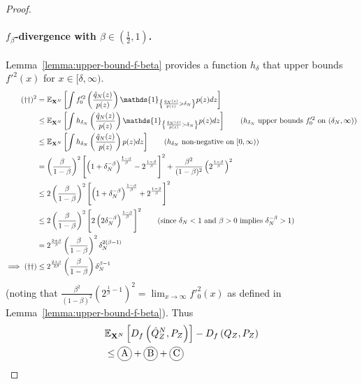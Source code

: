 \begin{proof}
\paragraph{$f_\beta$-divergence with $\beta\in(\frac{1}{2}, 1)$.}
Lemma~\ref{lemma:upper-bound-f-beta} provides a function $h_\delta$ that upper bounds $f'^2(x)$ for $x \in[\delta, \infty)$.
%
\begin{align*}
    (\dagger\dagger)^2 
    &= \E_{\XN} \left[ \int f_0'^2\left(\frac{\hat{q}_N(z)}{p(z)} \right) \mathds{1}_{\left\lbrace \frac{\hat{q}_N(z)}{p(z)} > \delta_N \right\rbrace} p(z) dz \right]
    \\
    &\leq \E_{\XN} \left[\int h_{\delta_N}\left(\frac{\hat{q}_N(z)}{p(z)} \right) \mathds{1}_{\left\lbrace \frac{\hat{q}_N(z)}{p(z)} > \delta_N \right\rbrace} p(z) dz \right]
    \qquad \text{($h_{\delta_N}$ upper bounds $f_0'^2$ on $(\delta_N, \infty)$)}
    \\
    &\leq \E_{\XN} \left[\int h_{\delta_N}\left(\frac{\hat{q}_N(z)}{p(z)} \right) p(z) dz \right]
    \qquad \text{($h_{\delta_N}$ non-negative on $[0, \infty)$)}
    \\
    &= \left(\frac{\beta}{1-\beta}\right)^2\left[ \left(1+\delta_N^{-\beta}\right)^\frac{1-\beta}{\beta}  - 2^{\frac{1-\beta}{\beta}}\right]^2 + \frac{\beta^2}{(1-\beta)^2}\left(2^{\frac{1-\beta}{\beta}}\right)^2\\
    &\leq 2\left(\frac{\beta}{1-\beta}\right)^2\left[ \left(1+\delta_N^{-\beta}\right)^\frac{1-\beta}{\beta}  + 2^{\frac{1-\beta}{\beta}}\right]^2\\
    &\leq 2\left(\frac{\beta}{1-\beta}\right)^2\left[ 2\left(2\delta_N^{-\beta}\right)^\frac{1-\beta}{\beta}\right]^2 
    \qquad (\text{since $\delta_N<1$ and $\beta>0$ implies $\delta_N^{-\beta} > 1$})\\
    &= 2^{\frac{2+\beta}{\beta}}\left(\frac{\beta}{1-\beta}\right)^2 \delta_N^{2(\beta - 1)}\\
    \implies (\dagger\dagger)&\leq 
    2^{\frac{2+\beta}{2\beta}}\left(\frac{\beta}{1-\beta}\right) \delta_N^{\beta - 1}\\
\end{align*}
%
(noting that $\frac{\beta^2}{(1-\beta)^2}\left(2^{\frac{1}{\beta} - 1}\right)^2 = \lim_{x\to\infty} f'^2_0(x)$ as defined in Lemma~\ref{lemma:upper-bound-f-beta}). Thus
%
\begin{align*}
    &\E_{\XN} \left[ D_f\left( \hat{Q}_Z^N , P_Z\right)\right] - D_f\left( Q_{Z} , P_Z\right)\\
    &\leq \encircle{A} + \encircle{B} + \encircle{C} \\

\end{align*}
\end{proof}
